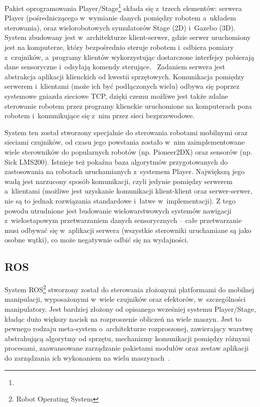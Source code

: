 Pakiet oprogramowania Player/Stage\footnote{}
składa się z~trzech elementów: serwera Player (pośredniczącego w~wymianie danych
pomiędzy robotem a~układem sterowania), oraz wielorobotowych symulatorów Stage (2D)
i~Gazebo (3D). System zbudowany jest w~architekturze klient-serwer, gdzie serwer
uruchomiony jest na komputerze, który bezpośrednio steruje robotem i~odbiera
pomiary z~czujników, a~programy klientów wykorzystując dostarczone interfejsy
pobierają dane sensoryczne i~odsyłają komendy sterujące.~\cite{gerkey03playerstage}
Zadaniem serwera jest abstrakcja aplikacji klienckich od kwestii sprzętowych.
Komunikacja pomiędzy serwerem i~klientami (może ich być podłączonych wielu)
odbywa się poprzez systemowe gniazda sieciowe TCP, dzięki czemu możliwe jest także
zdalne sterowanie robotem przez programy klienckie uruchomione na komputerach poza
robotem i~komunikujące się z~nim przez sieci bezprzewodowe.

System ten został stworzony specjalnie do sterowania robotami mobilnymi oraz sieciami
czujników, od czasu jego powstania zostało w~nim zaimplementowane wiele sterowników
do popularnych robotów (np. Pioneer2DX) oraz sensorów (np. Sick LMS200). Istnieje
też pokaźna baza algorytmów przygotowanych do zastosowania na robotach uruchamianych
z~systemem Player. Największą jego wadą jest narzucony sposób komunikacji, czyli
jedynie pomiędzy serwerem a~klientami (możliwe jest uzyskanie komunikacji klient-klient
oraz serwer-serwer, nie są to jednak rozwiązania standardowe i~łatwe w~implementacji).
Z tego powodu utrudnione jest budowanie wielowarstwowych systemów nawigacji z~wieloetapowym
przetwarzaniem danych sensorycznych -- całe przetwarzanie musi odbywać się w~aplikacji
serwera (wszystkie sterowniki uruchamiane są jako osobne wątki), co może negatywnie
odbić się na wydajności.

\subsection{ROS}

System ROS\footnote{Robot Operating System} stworzony został
do sterowania złożonymi platformami do mobilnej manipulacji, wyposażonymi w~wiele
czujników oraz efektorów, w~szczególności manipulatory. Jest bardziej złożony od
opisanego wcześniej systemu Player/Stage, kładąc dużo większy nacisk na rozproszenie
obliczeń na wiele maszyn. Jest to pewnego rodzaju meta-system o~architekturze rozproszonej,
zawierający warstwę abstrahującą algorytmy od sprzętu, mechanizmy komunikacji
pomiędzy różnymi procesami, zaawansowane zarządzanie pakietami modułów oraz zestaw
aplikacji do zarządzania ich wykonaniem na wielu maszynach~\cite{288}.

